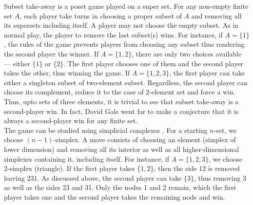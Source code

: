 \documentclass[a4paper, 12pt]{article}
\theoremstyle{remark} %
\begin{document}
Subset take-away is a poset  game played on a super set. For any non-empty finite set $A$, each player take turns in choosing a proper subset of $A$ and removing all its supersets including itself. A player may not choose the empty subset. As in normal play, the player to remove the last subset(s) wins. For instance, if $A = \{1\}$, the rules of the game prevents players from choosing any subset thus rendering the second player the winner. If $A = \{1, 2\}$, there are only two choices available --- either $\{1\}$ or $\{2\}$. The first player chooses one of them and the second player takes the other, thus winning the game. If $A = \{1, 2, 3\}$, the first player can take either a singleton subset of two-element subset. Regardless, the second player can choose its complement, reduce it to the case of 2-element set and force a win. Thus, upto sets of three elements, it is trivial to see that subset take-away is a second-player win. In fact, David Gale went far to make a conjecture  that it is always a second-player win for any finite set.\\

The game can be studied using simplicial complexes . For a starting $n$-set, we choose $(n-1)$-simplex. A move consists of choosing an element (simplex of lower dimension) and removing all its interior as well as all higher-dimensional simplexes containing it, including itself. For instance, if $A = \{1, 2, 3\}$, we choose 2-simplex (triangle). If the first player takes $\{1,2\}$, then the side 12 is removed leaving 231. As discussed above, the second player can take $\{3\}$, thus removing 3 as well as the sides 23 and 31. Only the nodes 1 and 2 remain, which the first player takes one and the second player takes the remaining node and win.\\

\begin{center}
\\
\end{center}
\end{document}
